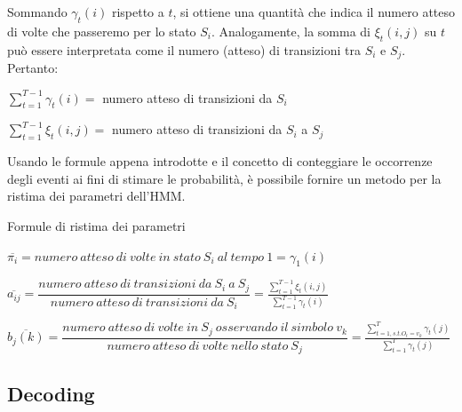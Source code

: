 \documentclass[hyperref={pdfpagelabels=false},slidestop,mathserif,red]{beamer}
\begin{document}
\begin{frame}
 \begin{block}{}
  Sommando $\gamma_{t}(i)$ rispetto a $t$, si ottiene una quantit\`a che indica il numero atteso di volte che passeremo per lo stato $S_{i}$. Analogamente, la somma di $\xi_{t}(i,j)$ su $t$ pu\`o essere interpretata come il numero (atteso) di transizioni tra $S_{i}$ e $S_{j}$. Pertanto:
\begin{center}
 $\sum_{t=1}^{T-1}\gamma_{t}(i) =$ numero atteso di transizioni da $S_{i}$
\end{center}
\begin{center}
 $\sum_{t=1}^{T-1}\xi_{t}(i,j) =$ numero atteso di transizioni da $S_{i}$ a $S_{j}$
\end{center}
 \end{block}

\begin{block}{}
 Usando le formule appena introdotte e il concetto di conteggiare le occorrenze degli eventi ai fini di stimare le probabilit\`a, \`e possibile fornire un metodo per la ristima dei parametri dell'HMM.
\end{block}
\end{frame}

\begin{frame}
 \begin{block}{Formule di ristima dei parametri}
 \begin{center}
$\overline{\pi_{i}} = numero\ atteso\ di\ volte\ in\ stato\ S_{i}\ al\ tempo\ 1 = \gamma_{1}(i)$
\end{center}

\begin{center}
 $\overline{a_{ij}} = \dfrac{numero\ atteso\ di\ transizioni\ da\ S_{i}\ a\ S_{j}}{numero\ atteso\ di\ transizioni\ da\ S_{i}} = \frac{\sum_{t=1}^{T-1}\xi_{t}(i,j)}{\sum_{t=1}^{T-1}\gamma_{t}(i)}$
\end{center}

\begin{center}
 $ \overline{b_{j}(k)} = \dfrac{numero\ atteso\ di\ volte\ in\ S_{j}\ osservando\ il\ simbolo\ v_{k}}{numero\ atteso\ di\ volte\ nello\ stato\ S_{j}} = \frac{\sum_{t=1, s.t. O_{t} = v_{k}}^{T}\gamma_{t}(j)}{\sum_{t=1}^{T}\gamma_{t}(j)}$
\end{center}

 \end{block}
\end{frame}


\subsection{Decoding}
\end{document}
